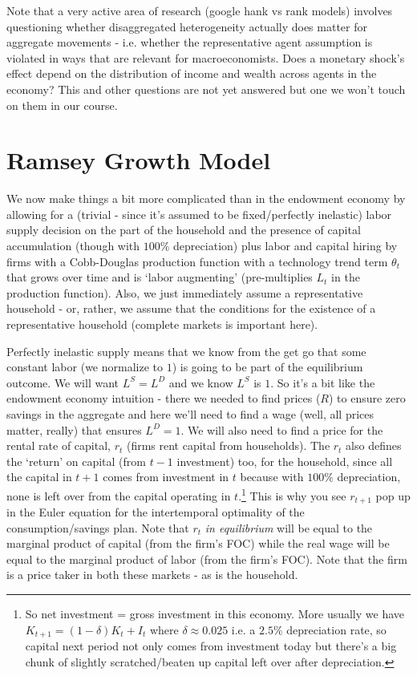 \documentclass[authoryear,11pt]{elsarticle}
\begin{document}
Note that a very active area of research (google hank vs rank models) involves questioning whether disaggregated heterogeneity actually does matter for aggregate movements - i.e. whether the representative agent assumption is violated in ways that are relevant for macroeconomists. Does a monetary shock's effect depend on the distribution of income and wealth across agents in the economy? This and other questions are not yet answered but one we won't touch on them in our course.

\section{Ramsey Growth Model}
We now make things a bit more complicated than in the endowment economy by allowing for a (trivial - since it's assumed to be fixed/perfectly inelastic) labor supply decision on the part of the household and the presence of capital accumulation (though with $100\%$ depreciation) plus labor and capital hiring by firms with a Cobb-Douglas production function with a technology trend term $\theta_{t}$ that grows over time and is `labor augmenting' (pre-multiplies $L_{t}$ in the production function). Also, we just immediately assume a representative household - or, rather, we assume that the conditions for the existence of a representative household (complete markets is important here).

Perfectly inelastic supply means that we know from the get go that some constant labor (we normalize to $1$) is going to be part of the equilibrium outcome. We will want $L^{S}=L^{D}$ and we know $L^{S}$ is $1$. So it's a bit like the endowment economy intuition - there we needed to find prices ($R$) to ensure zero savings in the aggregate and here we'll need to find a wage (well, all prices matter, really) that ensures $L^{D}=1$. We will also need to find a price for the rental rate of capital, $r_{t}$ (firms rent capital from households). The $r_{t}$ also defines the `return' on capital (from $t-1$ investment) too, for the household, since all the capital in $t+1$ comes from investment in $t$ because with $100\%$ depreciation, none is left over from the capital operating in $t$.\footnote{So net investment = gross investment in this economy. More usually we have $K_{t+1} = (1-\delta)K_{t} + I_{t}$ where $\delta \approx 0.025$ i.e. a $2.5\%$ depreciation rate, so capital next period not only comes from investment today but there's a big chunk of slightly scratched/beaten up capital left over after depreciation.} This is why you see $r_{t+1}$ pop up in the Euler equation for the intertemporal optimality of the consumption/savings plan. Note that $r_{t}$ \textit{in equilibrium} will be equal to the marginal product of capital (from the firm's FOC) while the real wage will be equal to the marginal product of labor (from the firm's FOC). Note that the firm is a price taker in both these markets - as is the household.
\end{document}
